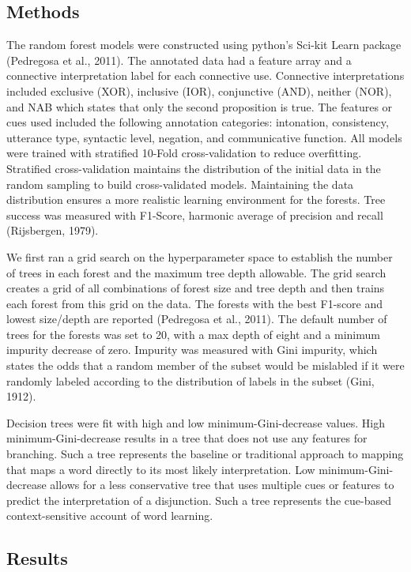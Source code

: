 \documentclass[
  ,man,floatsintext]{apa6}
\begin{document}
\hypertarget{methods-2}{%
\subsection{Methods}\label{methods-2}}

The random forest models were constructed using python's Sci-kit Learn package (Pedregosa et al., 2011). The annotated data had a feature array and a connective interpretation label for each connective use. Connective interpretations included exclusive (XOR), inclusive (IOR), conjunctive (AND), neither (NOR), and NAB which states that only the second proposition is true. The features or cues used included the following annotation categories: intonation, consistency, utterance type, syntactic level, negation, and communicative function. All models were trained with stratified 10-Fold cross-validation to reduce overfitting. Stratified cross-validation maintains the distribution of the initial data in the random sampling to build cross-validated models. Maintaining the data distribution ensures a more realistic learning environment for the forests. Tree success was measured with F1-Score, harmonic average of precision and recall (Rijsbergen, 1979).

We first ran a grid search on the hyperparameter space to establish the number of trees in each forest and the maximum tree depth allowable. The grid search creates a grid of all combinations of forest size and tree depth and then trains each forest from this grid on the data. The forests with the best F1-score and lowest size/depth are reported (Pedregosa et al., 2011). The default number of trees for the forests was set to 20, with a max depth of eight and a minimum impurity decrease of zero. Impurity was measured with Gini impurity, which states the odds that a random member of the subset would be mislabled if it were randomly labeled according to the distribution of labels in the subset (Gini, 1912).

Decision trees were fit with high and low minimum-Gini-decrease values. High minimum-Gini-decrease results in a tree that does not use any features for branching. Such a tree represents the baseline or traditional approach to mapping that maps a word directly to its most likely interpretation. Low minimum-Gini-decrease allows for a less conservative tree that uses multiple cues or features to predict the interpretation of a disjunction. Such a tree represents the cue-based context-sensitive account of word learning.

\hypertarget{results-1}{%
\subsection{Results}\label{results-1}}
\end{document}

